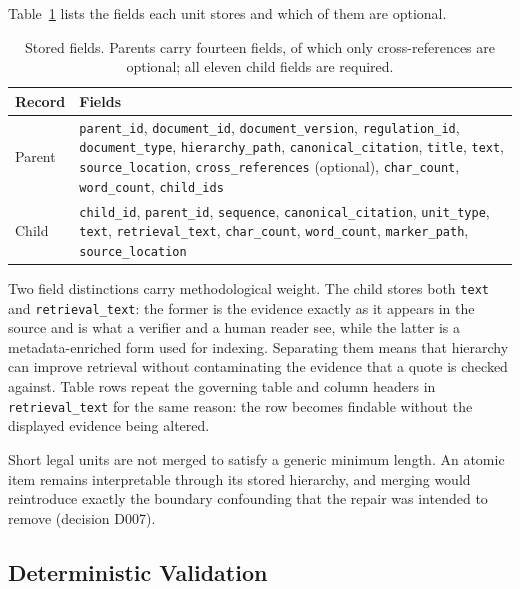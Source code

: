 Table~\ref{tab:schema-fields} lists the fields each unit stores and which of them are optional.

\begin{table}[htbp]
  \centering
  \caption{Stored fields. Parents carry fourteen fields, of which only cross-references are optional; all eleven child fields are required.}
  \label{tab:schema-fields}
  \small
  \begin{tabularx}{\textwidth}{@{}l X@{}}
    \toprule
    \textbf{Record} & \textbf{Fields} \\
    \midrule
    Parent &
      \texttt{parent\_id}, \texttt{document\_id}, \texttt{document\_version}, \texttt{regulation\_id},
      \texttt{document\_type}, \texttt{hierarchy\_path}, \texttt{canonical\_citation}, \texttt{title},
      \texttt{text}, \texttt{source\_location}, \texttt{cross\_references} (optional),
      \texttt{char\_count}, \texttt{word\_count}, \texttt{child\_ids} \\
    \addlinespace
    Child &
      \texttt{child\_id}, \texttt{parent\_id}, \texttt{sequence}, \texttt{canonical\_citation},
      \texttt{unit\_type}, \texttt{text}, \texttt{retrieval\_text}, \texttt{char\_count},
      \texttt{word\_count}, \texttt{marker\_path}, \texttt{source\_location} \\
    \bottomrule
  \end{tabularx}
\end{table}

Two field distinctions carry methodological weight. The child stores both \texttt{text} and \texttt{retrieval\_text}: the former is the evidence exactly as it appears in the source and is what a verifier and a human reader see, while the latter is a metadata-enriched form used for indexing. Separating them means that hierarchy can improve retrieval without contaminating the evidence that a quote is checked against. Table rows repeat the governing table and column headers in \texttt{retrieval\_text} for the same reason: the row becomes findable without the displayed evidence being altered.

Short legal units are not merged to satisfy a generic minimum length. An atomic item remains interpretable through its stored hierarchy, and merging would reintroduce exactly the boundary confounding that the repair was intended to remove (decision D007).

\subsection{Deterministic Validation}

